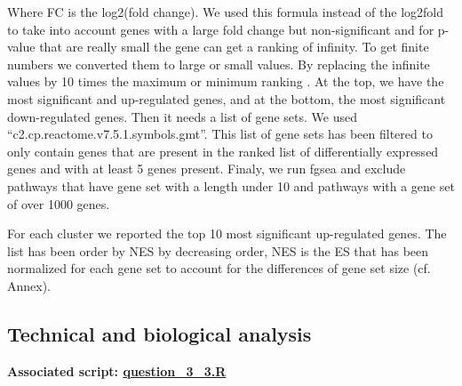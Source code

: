 \documentclass[a4paper, 11pt]{article}
\begin{document}
\begin{multicols}{2}
Where FC is the log2(fold change).
We used this formula instead of the log2fold to take into account genes with a large fold change but non-significant and for p-value that are really small the gene can get a ranking of infinity. To get finite numbers we converted them to large or small values. By replacing the infinite values by 10 times the maximum or minimum ranking .
 At the top, we have the most significant and up-regulated genes, and at the bottom, the most significant down-regulated genes. Then it needs a list of gene sets. We used “c2.cp.reactome.v7.5.1.symbols.gmt”. This list of gene sets has been filtered to only contain genes  that are present in the ranked list of differentially expressed genes and with at least 5 genes present. Finaly, we run fgsea  \citep{fgsea} and exclude pathways that have gene set with a length under 10 and pathways with a gene set of over 1000 genes.
 
For each cluster we reported the top  10 most significant up-regulated genes. The list has been order by NES by decreasing order, NES is the ES that has been normalized for each gene set to account for the differences of gene set size (cf. Annex).

\subsection{Technical and biological analysis}
\begin{scriptsize}	
	\textbf{Associated script: \href{https://github.com/leopoldguyot/BINF-F401-Project/blob/main/question_3_3.R}{question\_3\_3.R}
	}
\end{scriptsize}


\end{multicols}
\end{document}
